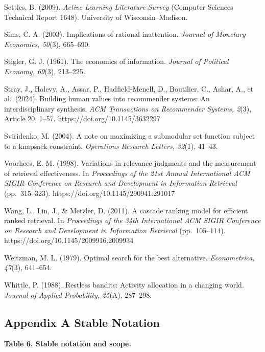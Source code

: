 \documentclass[
  11pt]{article}
\begin{document}
Settles, B. (2009). \emph{Active Learning Literature Survey} (Computer
Sciences Technical Report 1648). University of Wisconsin--Madison.

Sims, C. A. (2003). Implications of rational inattention. \emph{Journal
of Monetary Economics, 50}(3), 665--690.

Stigler, G. J. (1961). The economics of information. \emph{Journal of
Political Economy, 69}(3), 213--225.

Stray, J., Halevy, A., Assar, P., Hadfield-Menell, D., Boutilier, C.,
Ashar, A., et al.~(2024). Building human values into recommender
systems: An interdisciplinary synthesis. \emph{ACM Transactions on
Recommender Systems, 2}(3), Article 20, 1--57.
https://doi.org/10.1145/3632297

Sviridenko, M. (2004). A note on maximizing a submodular set function
subject to a knapsack constraint. \emph{Operations Research Letters,
32}(1), 41--43.

Voorhees, E. M. (1998). Variations in relevance judgments and the
measurement of retrieval effectiveness. In \emph{Proceedings of the 21st
Annual International ACM SIGIR Conference on Research and Development in
Information Retrieval} (pp.~315--323).
https://doi.org/10.1145/290941.291017

Wang, L., Lin, J., \& Metzler, D. (2011). A cascade ranking model for
efficient ranked retrieval. In \emph{Proceedings of the 34th
International ACM SIGIR Conference on Research and Development in
Information Retrieval} (pp.~105--114).
https://doi.org/10.1145/2009916.2009934

Weitzman, M. L. (1979). Optimal search for the best alternative.
\emph{Econometrica, 47}(3), 641--654.

Whittle, P. (1988). Restless bandits: Activity allocation in a changing
world. \emph{Journal of Applied Probability, 25}(A), 287--298.

\endgroup

\subsection{Appendix A Stable
Notation}\label{appendix-a-stable-notation}

\textbf{Table 6. Stable notation and scope.}
\end{document}
